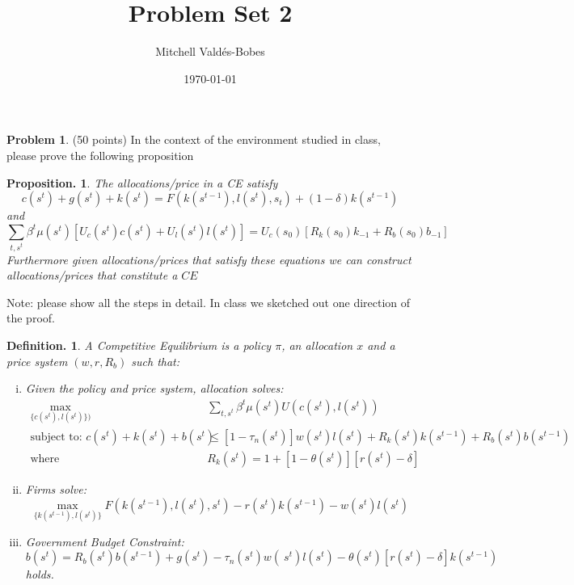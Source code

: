 \documentclass[12pt]{article}
\title{Problem Set 2}
\author{Mitchell Valdés-Bobes}
\date{\today}
\newtheorem{defin}{Definition.}
\newtheorem{prop}{Proposition. }
\theoremstyle{definition}
\newtheorem{problem}{Problem}
\begin{document}
\maketitle

\begin{problem} (50 points) In the context of the environment studied in class, please prove the following proposition
\begin{prop}
 The allocations/price in a CE satisfy 
\begin{equation}\label{cond1}
{c}\left({s}^{t}\right)+{g}\left({s}^{{t}}\right)+{k}\left({s}^{{t}}\right)={F}\left({k}\left({s}^{{t}-1}\right), {l}\left({s}^{{t}}\right), {s}_{{t}}\right)+(1-\delta) {k}\left({s}^{{t}-1}\right)
\end{equation}
and
\begin{equation}\label{cond2}
\sum_{t, s^{t}} \beta^{t} \mu\left(s^{t}\right)\left[U_{c}\left(s^{t}\right) c\left(s^{t}\right)+U_{l}\left(s^{t}\right) l\left(s^{t}\right)\right]=U_{c}\left(s_{0}\right)\left[R_{k}\left(s_{0}\right) k_{-1}+R_{b}\left(s_{0}\right) b_{-1}\right]
\end{equation}
Furthermore given allocations/prices that satisfy these equations we can construct allocations/prices that constitute a ${CE}$
\end{prop}
Note: please show all the steps in detail. In class we sketched out one direction of the proof.
\end{problem}
\begin{defin}A Competitive Equilibrium is a policy $\pi$, an allocation $x$ and a price system $\left(w, r, R_{b}\right)$ such that:
\begin{enumerate}[(i)]
    \item Given the policy and price system, allocation solves:
\begin{align*}
    \max_{\{c(s^{t}), l(s^t)\}) }\quad &\sum_{{t}, {s}^{t}} \beta^{t} \mu\left({s}^{{t}}\right) {U}\left(c\left(s^{t}\right), l\left(s^{t}\right)\right)\\ \text{subject to: }
    c\left(s^{t}\right)+k\left(s^{t}\right)+b\left(s^{t}\right) &\leqslant\left[1-\tau_n\left(s^{t}\right)\right] w\left(s^{t}\right) l\left(s^{t}\right)+R_{k}\left(s^{t}\right) k\left(s^{t-1}\right)+R_{b}\left(s^{t}\right) b\left(s^{t-1}\right)\\
    \text{where }&
R_{k}\left(s^{t}\right)=1+\left[1-\theta\left(s^{t}\right)\right]\left[r\left(s^{t}\right)-\delta\right]
\end{align*}
\item Firms solve:
$$\max_{\{k(s^{t-1}), l(s^t) \}}F(k(s^{t-1}), l(s^t), s^t) - r(s^t)k(s^{t-1}) - w(s^t)l(s^t)$$

\item Government Budget Constraint:
$$
 {b}\left( {s}^{ {t}}\right)= {R}_{ {b}}\left( {s}^{ {t}}\right)  {b}\left( {s}^{ {t}-1}\right)+ {g}\left( {s}^{ {t}}\right)-\tau_n\left( {s}^{ {t}}\right) w\left( {~s}^{ {t}}\right)  {l}\left( {s}^{ {t}}\right)-\theta\left( {s}^{ {t}}\right)\left[ {r}\left( {s}^{ {t}}\right)-\delta\right]  {k}\left( {s}^{ {t}-1}\right)
$$
holds.
\end{enumerate}
\end{defin}
\end{document}
